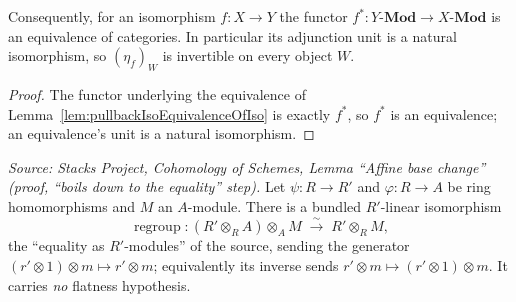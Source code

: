 \begin{lemma}
  \label{lem:pullback_isEquivalence_of_iso}
  Consequently, for an isomorphism \(f : X \to Y\) the functor
  \(f^* : Y\text{-}\mathbf{Mod} \to X\text{-}\mathbf{Mod}\) is an equivalence of
  categories. In particular its adjunction unit is a natural isomorphism, so
  \((\eta_{f})_{W}\) is invertible on every object \(W\).
\end{lemma}
\begin{proof}

  The functor underlying the equivalence of
  Lemma~\ref{lem:pullbackIsoEquivalenceOfIso} is exactly \(f^*\), so \(f^*\) is an
  equivalence; an equivalence's unit is a natural isomorphism.
\end{proof}


\begin{lemma}
  \label{lem:base_change_mate_regroupEquiv}
  \textit{Source: Stacks Project, Cohomology of Schemes, Lemma ``Affine base
  change'' (proof, ``boils down to the equality'' step).}
  Let \(\psi : R \to R'\) and \(\varphi : R \to A\) be ring homomorphisms and \(M\) an
  \(A\)-module. There is a bundled \(R'\)-linear isomorphism
  \[
    \operatorname{regroup} :
    (R' \otimes_R A) \otimes_A M \;\xrightarrow{\ \sim\ }\; R' \otimes_R M ,
  \]
  the ``equality as \(R'\)-modules'' of the source, sending the generator
  \((r' \otimes 1) \otimes m \mapsto r' \otimes m\); equivalently its inverse sends
  \(r' \otimes m \mapsto (r' \otimes 1) \otimes m\). It carries \emph{no} flatness
  hypothesis.
\end{lemma}

